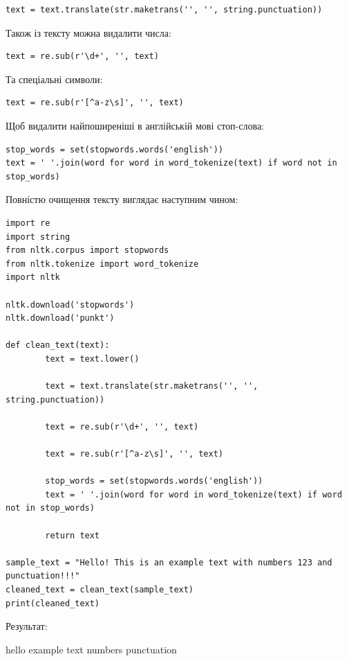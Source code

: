 \begin{lstlisting}
text = text.translate(str.maketrans('', '', string.punctuation))
\end{lstlisting}

Також із тексту можна видалити числа:

\begin{lstlisting}
text = re.sub(r'\d+', '', text)
\end{lstlisting}

Та спеціальні символи:

\begin{lstlisting}
text = re.sub(r'[^a-z\s]', '', text)
\end{lstlisting}

Щоб видалити найпоширеніші в англійській мові стоп-слова:

\begin{lstlisting}
stop_words = set(stopwords.words('english'))
text = ' '.join(word for word in word_tokenize(text) if word not in stop_words)
\end{lstlisting}

Повністю очищення тексту виглядає наступним чином:

\begin{lstlisting}
import re
import string
from nltk.corpus import stopwords
from nltk.tokenize import word_tokenize
import nltk

nltk.download('stopwords')
nltk.download('punkt')

def clean_text(text):
        text = text.lower()

        text = text.translate(str.maketrans('', '', string.punctuation))

        text = re.sub(r'\d+', '', text)

        text = re.sub(r'[^a-z\s]', '', text)

        stop_words = set(stopwords.words('english'))
        text = ' '.join(word for word in word_tokenize(text) if word not in stop_words)

        return text

sample_text = "Hello! This is an example text with numbers 123 and punctuation!!!"
cleaned_text = clean_text(sample_text)
print(cleaned_text)
\end{lstlisting}

Результат:

\begin{console}
hello example text numbers punctuation
\end{console}

